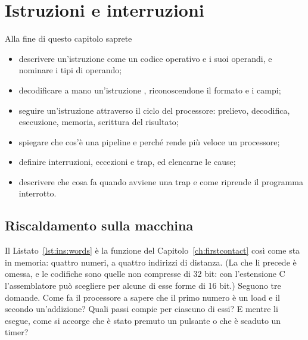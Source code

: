 \chapter{Istruzioni e interruzioni}
\label{ch:instructions}


\begin{chapgoals}
Alla fine di questo capitolo saprete
\begin{itemize}
\item descrivere un'istruzione come un codice operativo e i suoi operandi, e nominare i tipi di operando;
\item decodificare a mano un'istruzione \riscv, riconoscendone il formato e i campi;
\item seguire un'istruzione attraverso il ciclo del processore: prelievo, decodifica, esecuzione, memoria, scrittura del risultato;
\item spiegare che cos'è una pipeline e perché rende più veloce un processore;
\item definire interruzioni, eccezioni e trap, ed elencarne le cause;
\item descrivere che cosa fa \riscv quando avviene una trap e come riprende il programma interrotto.
\end{itemize}
\end{chapgoals}


\section{Riscaldamento sulla macchina}


Il Listato~\ref{lst:ins:words} è la funzione  del
Capitolo~\ref{ch:firstcontact} così come sta in memoria: quattro numeri, a
quattro indirizzi di distanza. (La  che li precede è omessa, e le
codifiche sono quelle non compresse di 32 bit: con l'estensione C
l'assemblatore può scegliere per alcune di esse forme di 16 bit.) Seguono tre
domande. Come fa il processore a sapere che il primo numero è un load e il
secondo un'addizione? Quali passi compie per ciascuno di essi? E mentre li
esegue, come si accorge che è stato premuto un pulsante o che è scaduto un
timer?

